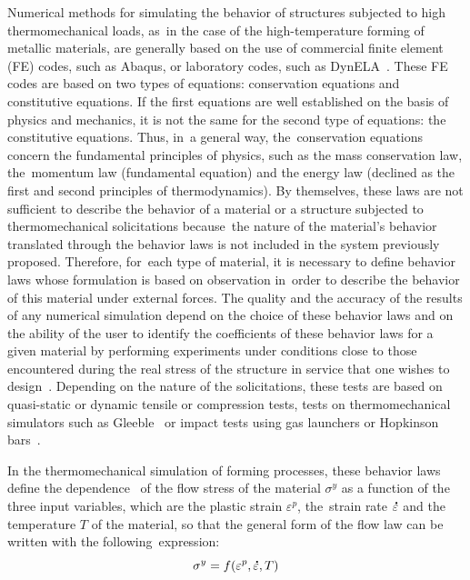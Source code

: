 \documentclass[algorithms,article,accept,pdftex,oneauthors]{Definitions/mdpi}
\DeclareRobustCommand{\mdot}[1]{\accentset{\mbox{\bfseries .}}{#1}}
\begin{document}
Numerical methods for simulating the behavior of structures subjected to high thermomechanical loads, as~in the case of the high-temperature forming of metallic materials, are generally based on the use of commercial finite element (FE) codes, such as Abaqus, or laboratory codes, such as DynELA~\cite{Pantale-2004}.
These FE codes are based on two types of equations: conservation equations and constitutive equations.
If the first equations are well established on the basis of physics and mechanics, it is not the same for the second type of equations: the constitutive equations.
Thus, in~a general way, the~conservation equations concern the fundamental principles of physics, such as the mass conservation law, the~momentum law (fundamental equation) and the energy law (declined as the first and second principles of thermodynamics).
By themselves, these laws are not sufficient to describe the behavior of a material or a structure subjected to thermomechanical solicitations because~the nature of the material’s behavior translated through the behavior laws is not included in the system previously proposed.
Therefore, for~each type of material, it is necessary to define behavior laws whose formulation is based on observation in~order to describe the behavior of this material under external forces.
The quality and the accuracy of the results of any numerical simulation depend on the choice of these behavior laws and on the ability of the user to identify the coefficients of these behavior laws for a given material by performing experiments under conditions close to those encountered during the real stress of the structure in service that one wishes to design~\cite{Dey-2007}.
Depending on the nature of the solicitations, these tests are based on quasi-static or dynamic tensile or compression tests, tests on thermomechanical simulators such as Gleeble~\cite{Lin-2009} or impact tests using gas launchers or Hopkinson bars~\cite{Kolsky-1949}.

In the thermomechanical simulation of forming processes, these behavior laws define the dependence~\cite{Lee-2006} of the flow stress of the material $\sigma^y$ as a function of the three input variables, which are the plastic strain $\varepsilon^p$, the~strain rate $\mdot\varepsilon$ and the temperature $T$ of the material, so that the general form of the flow law can be written with the following~expression:
\begin{equation}
\sigma^y = f\left(\varepsilon^p,\mdot\varepsilon,T\right)\label{eq:GenFlow}
\end{equation}
\end{document}
